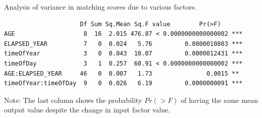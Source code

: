 \documentclass{cta-author}%
\begin{document}
\begin{table}[!b]
\caption{Analysis of variance in matching scores due to various factors. \label{fAOV}}
{
\tiny
\begin{verbatim}
                     Df Sum Sq.Mean Sq.F value        Pr(>F)   
AGE                   8  16  2.015 476.87 < 0.0000000000000002 ***
ELAPSED_YEAR          7   0  0.024   5.76         0.0000010803 ***
timeOfYear            3   0  0.043  10.07         0.0000012431 ***
timeOfDay             3   1  0.257  60.91 < 0.0000000000000002 ***
AGE:ELAPSED_YEAR     46   0  0.007   1.73               0.0015 **
timeOfYear:timeOfDay  9   0  0.026   6.19         0.0000000091 ***
\end{verbatim}
}
{\scriptsize
Note: 
The last column shows the probability $Pr(>F)$  of having the same mean output  value despite the change in input factor value. 
}
\end{table}
\end{document}
